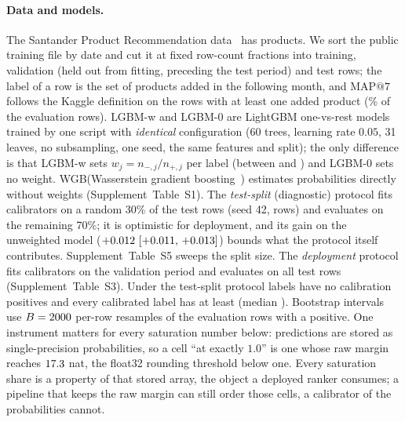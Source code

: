 \documentclass[sigconf,nonacm]{acmart}
\makeatletter
\newcommand{\Sm}{\textsf{LGBM-w}\xspace}
\newcommand{\Wm}{\textsf{WGB}\xspace}
\newcommand{\Nm}{\textsf{LGBM-0}\xspace}
\newcommand{\mapseven}{\mathrm{MAP}@7\xspace}
\newcommand{\Supp}[1]{Supplement~#1}  %
\makeatother
\begin{document}
\paragraph{Data and models.} The Santander Product Recommendation data~\cite{KaggleSantander2016} has \nnLabels{} products. We sort the public training file by date and cut it at fixed row-count fractions into \nnTrain{} training, \nnValRows{} validation (held out from fitting, preceding the test period) and \nnTest{} test rows; the label of a row is the set of products added in the following month, and $\mapseven$ follows the Kaggle definition on the rows with at least one added product (\nfracRowsWithPos\% of the \nnEvalRows{} evaluation rows). \Sm and \Nm are LightGBM one-vs-rest models trained by one script with \emph{identical} configuration (60 trees, learning rate $0.05$, 31 leaves, no subsampling, one seed, the same features and split); the only difference is that \Sm sets $w_j=n_{-,j}/n_{+,j}$ per label (between \nwMin{} and \nwMax) and \Nm sets no weight. \Wm (Wasserstein gradient boosting~\cite{Matsubara2024WGBoost}) estimates probabilities directly without weights (\Supp{Table~S1}). The \emph{test-split} (diagnostic) protocol fits calibrators on a random 30\% of the test rows (seed 42, \nnVal{} rows) and evaluates on the remaining 70\%; it is optimistic for deployment, and its gain on the unweighted model ($+0.012~[+0.011,\,+0.013]$) bounds what the protocol itself contributes. \Supp{Table~S5} sweeps the split size. The \emph{deployment} protocol fits calibrators on the validation period and evaluates on all test rows (\Supp{Table~S3}). Under the test-split protocol \nSnDead{} labels have no calibration positives and every calibrated label has at least \ncalPosMinAlive{} (median \ncalPosMedAlive). Bootstrap intervals use $B=2000$ per-row resamples of the \nbootN{} evaluation rows with a positive. One instrument matters for every saturation number below: predictions are stored as single-precision probabilities, so a cell ``at exactly $1.0$'' is one whose raw margin reaches $17.3$ nat, the float32 rounding threshold below one. Every saturation share is a property of that stored array, the object a deployed ranker consumes; a pipeline that keeps the raw margin can still order those cells, a calibrator of the probabilities cannot.
\end{document}

